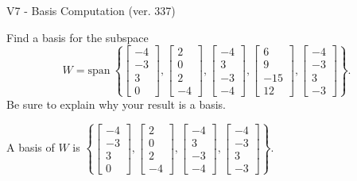 \begin{exercise}
  \begin{exerciseTitle}V7 - Basis Computation (ver. 337)\end{exerciseTitle}
  \begin{exerciseStatement}
    Find a basis for the subspace 
\[W=\mathrm{span}\ \left\{\left[\begin{array}{r}
-4 \\
-3 \\
3 \\
0
\end{array}\right] , \left[\begin{array}{r}
2 \\
0 \\
2 \\
-4
\end{array}\right] , \left[\begin{array}{r}
-4 \\
3 \\
-3 \\
-4
\end{array}\right] , \left[\begin{array}{r}
6 \\
9 \\
-15 \\
12
\end{array}\right] , \left[\begin{array}{r}
-4 \\
-3 \\
3 \\
-3
\end{array}\right]\right\}.\]
 Be sure to explain why your result is a basis.


  \end{exerciseStatement}
  \begin{exerciseAnswer}
   A basis of \(W\) is  \(\left\{\left[\begin{array}{r}
-4 \\
-3 \\
3 \\
0
\end{array}\right] , \left[\begin{array}{r}
2 \\
0 \\
2 \\
-4
\end{array}\right] , \left[\begin{array}{r}
-4 \\
3 \\
-3 \\
-4
\end{array}\right] , \left[\begin{array}{r}
-4 \\
-3 \\
3 \\
-3
\end{array}\right]\right\}\).
  


  \end{exerciseAnswer}
\end{exercise}